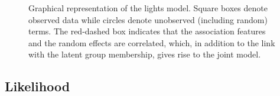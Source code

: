 \documentclass[11pt]{article}
\begin{document}
\begin{figure}[!htb]
{}
\caption{Graphical representation of the lights model. Square boxes denote observed data while circles denote unobserved (including random) terms. The red-dashed box indicates that the association features and the random effects are correlated, which, in addition to the link with the latent group membership, gives rise to the joint model.}
\label{fig:graphical-model}
\end{figure}
 
\subsection{Likelihood}
\end{document}
